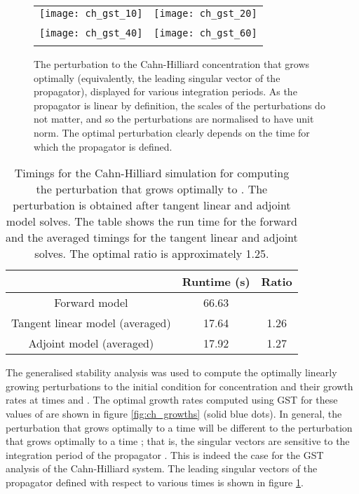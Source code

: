 \documentclass{siamltex}
\begin{document}
\begin{figure}
  \centering
  \begin{tabular}{cc}
    \texttt{[image: ch\_gst\_10]} & \texttt{[image: ch\_gst\_20]}
    \\
     & 
    \\
    \texttt{[image: ch\_gst\_40]} & \texttt{[image: ch\_gst\_60]}
    \\
     & 
  \end{tabular}
  \caption{The perturbation to the Cahn-Hilliard concentration that grows optimally (equivalently, the leading singular vector of
  the propagator), displayed for various integration periods. As the propagator is linear by definition, the scales of the perturbations
  do not matter, and so the perturbations are normalised to have unit norm. The optimal perturbation clearly depends on the
  time for which the propagator is defined.}
  \label{fig:ch_gst}
\end{figure}
\begin{table}[t]
\centering
\begin{tabular}{ccc}
\toprule
       & Runtime (s) & Ratio \\
\midrule
Forward model & 66.63  &     \\
Tangent linear model (averaged) & 17.64 & 1.26 \\
Adjoint model (averaged) & 17.92  & 1.27 \\
\bottomrule
\end{tabular}
\caption{Timings for the Cahn-Hilliard simulation for computing the perturbation that grows optimally to . 
  The perturbation is obtained after  tangent linear and adjoint model solves. 
 The table shows the run time for the forward and the averaged timings for the tangent linear and adjoint solves. The optimal ratio is
 approximately 1.25.}
\label{tab:cahn-hilliard-timings}
\end{table}

The generalised stability analysis was used to compute the optimally linearly growing perturbations to the initial condition for concentration and their
growth rates at times
   and . The optimal growth rates computed using GST for these values of  are shown in figure \ref{fig:ch_growths}
(solid blue dots).
In general, the perturbation that grows optimally to a time  will be different to the perturbation that grows optimally to a time ; that is,
the singular vectors are sensitive to the integration period of the propagator \cite[pg. 220]{kalnay2002}. This is indeed the case for the GST analysis of the
Cahn-Hilliard system. The leading singular vectors of the propagator defined with respect to various times is shown in figure \ref{fig:ch_gst}. 
\end{document}
